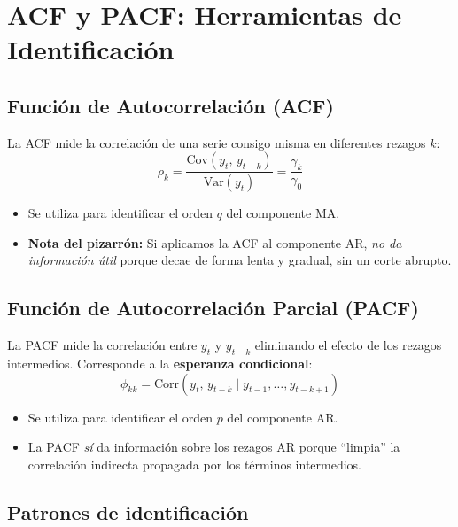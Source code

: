 \documentclass[12pt,a4paper]{article}
\begin{document}
\section{ACF y PACF: Herramientas de Identificación}

\subsection{Función de Autocorrelación (ACF)}

La ACF mide la correlación de una serie consigo misma en diferentes rezagos $k$:
\begin{equation}
  \rho_k = \frac{\text{Cov}(y_t,\, y_{t-k})}{\text{Var}(y_t)}
  = \frac{\gamma_k}{\gamma_0}
\end{equation}

\begin{itemize}
  \item Se utiliza para identificar el orden $q$ del componente MA.
  \item \textbf{Nota del pizarrón:} Si aplicamos la ACF al componente AR, \emph{no da
    información útil} porque decae de forma lenta y gradual, sin un corte abrupto.
\end{itemize}

\subsection{Función de Autocorrelación Parcial (PACF)}

La PACF mide la correlación entre $y_t$ y $y_{t-k}$ eliminando el efecto de los
rezagos intermedios. Corresponde a la \textbf{esperanza condicional}:
\begin{equation}
  \phi_{kk} = \text{Corr}(y_t,\, y_{t-k} \mid y_{t-1}, \ldots, y_{t-k+1})
\end{equation}

\begin{itemize}
  \item Se utiliza para identificar el orden $p$ del componente AR.
  \item La PACF \emph{sí} da información sobre los rezagos AR porque ``limpia'' la
    correlación indirecta propagada por los términos intermedios.
\end{itemize}

\subsection{Patrones de identificación}
\end{document}

